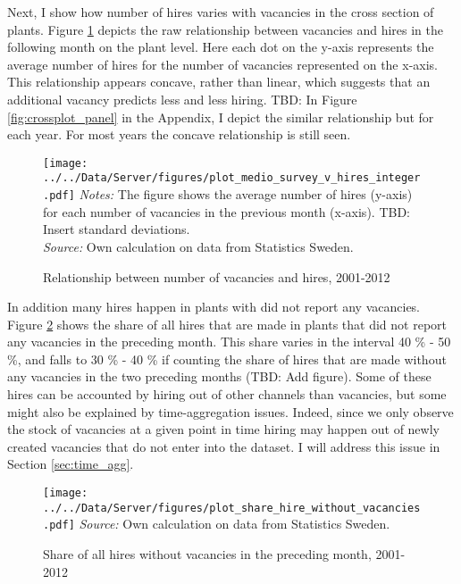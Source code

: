 Next, I show how number of hires varies with vacancies in the cross section of plants. Figure \ref{fig:crossplot} depicts the raw relationship between vacancies and hires in the following month on the plant level. Here each dot on the y-axis represents the average number of hires for the number of vacancies represented on the x-axis. This relationship appears concave, rather than linear,  which suggests that an additional vacancy predicts less and less hiring. TBD: In Figure \ref{fig:crossplot_panel} in the Appendix, I depict the similar relationship but for each year. For most years the concave relationship is still seen. 

\begin{figure}[t]
\centering
\caption{Relationship between number of vacancies and hires, 2001-2012}
\texttt{[image: ../../Data/Server/figures/plot\_medio\_survey\_v\_hires\_integer.pdf]}
\flushleft
\footnotesize{\emph{Notes:} The figure shows the average number of hires (y-axis) for each number of vacancies in the previous month (x-axis). TBD: Insert standard deviations.} \\
\footnotesize{\emph{Source:} Own calculation on data from Statistics Sweden.}
\label{fig:crossplot}
\end{figure}

In addition many hires happen in plants with did not report any vacancies. Figure \ref{fig:share_without} shows the share of all hires that are made in plants that did not report any vacancies in the preceding month. This share varies in the interval 40 \% - 50 \%, and falls to 30 \% - 40 \% if counting the share of hires that are made without any vacancies in the two preceding months (TBD: Add figure). Some of these hires can be accounted by hiring out of other channels than vacancies, but some might also be explained by time-aggregation issues. Indeed, since we only observe the stock of vacancies at a given point in time hiring may happen out of newly created vacancies that do not enter into the dataset. I will address this issue in Section \ref{sec:time_agg}.

\begin{figure}[t]
\centering
\caption{Share of all hires without vacancies in the preceding month, 2001-2012}
\texttt{[image: ../../Data/Server/figures/plot\_share\_hire\_without\_vacancies.pdf]}
\flushleft
\footnotesize{\emph{Source:} Own calculation on data from Statistics Sweden.}
\label{fig:share_without}
\end{figure}

